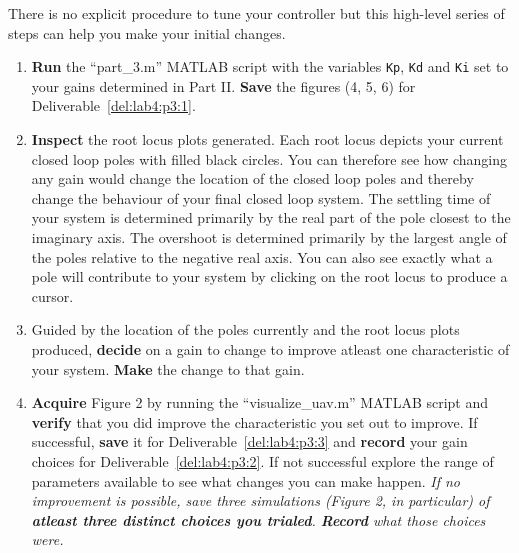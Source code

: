 \begin{procedure}[label={proc:lab4:tune}]
  There is no explicit procedure to tune your controller but this high-level series of steps can help you make your initial changes.
  \begin{enumerate}[label={(\arabic*)}]
    \item{%
      \textbf{Run} the ``part\_3.m'' MATLAB script with the variables \texttt{Kp}, \texttt{Kd} and \texttt{Ki} set to your gains determined in Part II.
      \textbf{Save} the figures (4, 5, 6) for Deliverable~\ref{del:lab4:p3:1}.
    }
    \item{%
      \textbf{Inspect} the root locus plots generated.
      Each root locus depicts your current closed loop poles with filled black circles.
      You can therefore see how changing any gain would change the location of the closed loop poles and thereby change the behaviour of your final closed loop system.
      The settling time of your system is determined primarily by the real part of the pole closest to the imaginary axis.
      The overshoot is determined primarily by the largest angle of the poles relative to the negative real axis.
      You can also see exactly what a pole will contribute to your system by clicking on the root locus to produce a cursor.
    }
    \item{%
      Guided by the location of the poles currently and the root locus plots produced, \textbf{decide} on a gain to change to improve atleast one characteristic of your system.
      \textbf{Make} the change to that gain. 
    }
    \item{%
      \textbf{Acquire} Figure 2 by running the ``visualize\_uav.m'' MATLAB script and \textbf{verify} that you did improve the characteristic you set out to improve.
      If successful, \textbf{save} it for Deliverable~\ref{del:lab4:p3:3} and \textbf{record} your gain choices for Deliverable~\ref{del:lab4:p3:2}.
      If not successful explore the range of parameters available to see what changes you can make happen.
      \emph{If no improvement is possible, save three simulations (Figure 2, in particular) of \textbf{atleast three distinct choices you trialed}. \textbf{Record} what those choices were.}
    }
  \end{enumerate}
\end{procedure}

